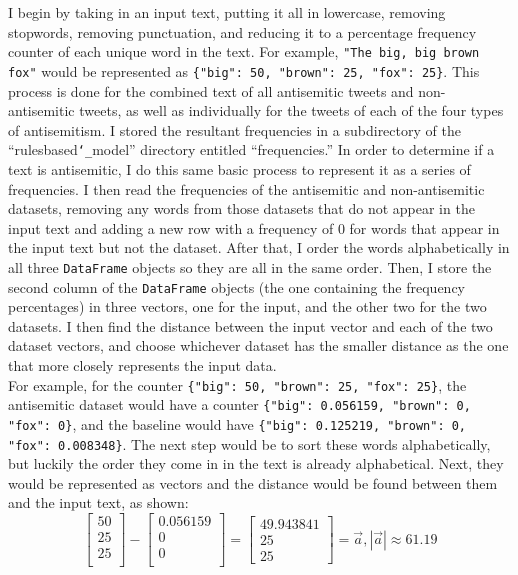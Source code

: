 \documentclass{article}
\begin{document}
I begin by taking in an input text, putting it all in lowercase, removing stopwords, removing punctuation, and reducing it to a percentage frequency counter of each unique word in the text. For example, \texttt{"The big, big brown fox"} would be represented as \texttt{\{"big": 50, "brown": 25, "fox": 25\}}. This process is done for the combined text of all antisemitic tweets and non-antisemitic tweets, as well as individually for the tweets of each of the four types of antisemitism. I stored the resultant frequencies in a subdirectory of the ``rulesbased\texttt{\char`_}model'' directory entitled ``frequencies.'' In order to determine if a text is antisemitic, I do this same basic process to represent it as a series of frequencies. I then read the frequencies of the antisemitic and non-antisemitic datasets, removing any words from those datasets that do not appear in the input text and adding a new row with a frequency of 0 for words that appear in the input text but not the dataset. After that, I order the words alphabetically in all three \texttt{DataFrame} objects so they are all in the same order. Then, I store the second column of the \texttt{DataFrame} objects (the one containing the frequency percentages) in three vectors, one for the input, and the other two for the two datasets. I then find the distance between the input vector and each of the two dataset vectors, and choose whichever dataset has the smaller distance as the one that more closely represents the input data.\\

For example, for the counter \texttt{\{"big": 50, "brown": 25, "fox": 25\}}, the antisemitic dataset would have a counter \texttt{\{"big": 0.056159, "brown": 0, "fox": 0\}}, and the baseline would have \texttt{\{"big": 0.125219, "brown": 0, "fox": 0.008348\}}. The next step would be to sort these words alphabetically, but luckily the order they come in in the text is already alphabetical. Next, they would be represented as vectors and the distance would be found between them and the input text, as shown:\\
\[
\left[ {\begin{array}{c}
    50\\
    25\\
    25\\
  \end{array} } \right] - \left[ {\begin{array}{c}
    0.056159\\
    0\\
    0\\
  \end{array} } \right] = \left[ {\begin{array}{c}
    49.943841\\
    25\\
    25\
  \end{array} } \right] = \vec{a} , \left| \vec{a} \right| \approx 61.19
\]
\end{document}
